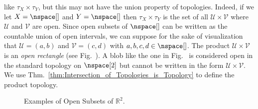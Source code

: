 \documentclass{book}                                                           %
\begin{document}
                like $\tau_{X}\times\tau_{Y}$, but this may not have the union
                property of topologies. Indeed, if we let $X=\nspace[]$ and
                $Y=\nspace[]$ then $\tau_{X}\times\tau_{Y}$ is the set of all
                $\mathcal{U}\times\mathcal{V}$ where $\mathcal{U}$ and
                $\mathcal{V}$ are open. Since open subsets of $\nspace[]$ can be
                written as the countable union of open intervals, we can suppose
                for the sake of visualization that $\mathcal{U}=(a,b)$ and
                $\mathcal{V}=(c,d)$ with $a,b,c,d\in\nspace[]$. The product
                $\mathcal{U}\times\mathcal{V}$ is an \textit{open rectangle}
                (see Fig.~). A blob like the
                one in Fig.~ is considered
                open in the standard topology on $\nspace[2]$ but cannot be
                written in the form $\mathcal{U}\times\mathcal{V}$. We use
                Thm.~\ref{thm:Intersection_of_Topologies_is_Topology} to define
                the product topology.
                \begin{figure}[H]
                    \centering
                    \captionsetup{type=figure}
                    \begin{subfigure}[b]{0.49\textwidth}
                        \centering
                        
                        \label{fig:Open_Rectangle_in_R2}
                    \end{subfigure}
                    \begin{subfigure}[b]{0.49\textwidth}
                        \centering
                        \label{fig:Open_Subset_Not_Product}
                    \end{subfigure}
                    \caption{Examples of Open Subsets of $\mathbb{R}^{2}$.}
                    \label{fig:Point_Set_Top_Open_Subsets_R2}
                \end{figure}
\end{document}
